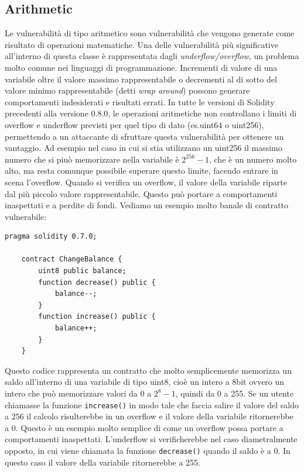 \documentclass[../../Thesis.tex]{subfiles}
\begin{document}
\subsection{Arithmetic}
Le vulnerabilità di tipo aritmetico \cite{sc-vulnerabilities} sono vulnerabilità che vengono generate come risultato di operazioni matematiche. Una delle vulnerabilità più significative all'interno di questa classe è rappresentata dagli \emph{underflow/overflow}, un problema molto comune nei linguaggi di programmazione. Incrementi di valore di una variabile oltre il valore massimo rappresentabile o decrementi al di sotto del valore minimo rappresentabile (detti \emph{wrap around}) possono generare comportamenti indesiderati e risultati errati. In tutte le versioni di Solidity precedenti alla versione 0.8.0, le operazioni aritmetiche non controllano i limiti di overflow e underflow previsti per quel tipo di dato (es.uint64 o uint256), permettendo a un attaccante di sfruttare questa vulnerabilità per ottenere un vantaggio. Ad esempio nel caso in cui si stia utilizzano un uint256 il massimo numero che si piuò memorizzare nella variabile è $2^{256} - 1$, che è un numero molto alto, ma resta comunque possibile superare questo limite, facendo entrare in scena l'overflow. Quando si verifica un overflow, il valore della variabile riparte dal più piccolo valore rappresentabile. Questo può portare a comportamenti inaspettati e a perdite di fondi. Vediamo un esempio molto banale di contratto vulnerabile:
\begin{lstlisting}[language=Solidity]
    pragma solidity 0.7.0;

    contract ChangeBalance {
        uint8 public balance;
        function decrease() public {
            balance--;
        }
        function increase() public {
            balance++;
        }
    }
\end{lstlisting}
Questo codice rappresenta un contratto che molto semplicemente memorizza un saldo all'interno di una variabile di tipo uint8, cioè un intero a 8bit ovvero un intero che può memorizzare valori da 0 a $2^8-1$, quindi da 0 a 255. Se un utente chiamasse la funzione \texttt{increase()} in modo tale che faccia salire il valore del saldo a $256$ il calcolo risulterebbe in un overflow e il valore della variabile ritornerebbe a 0. Questo è un esempio molto semplice di come un overflow possa portare a comportamenti inaspettati. L'underflow si verificherebbe nel caso diametralmente opposto, in cui viene chiamata la funzione \texttt{decrease()} quando il saldo è a 0. In questo caso il valore della variabile ritornerebbe a 255.
\end{document}
